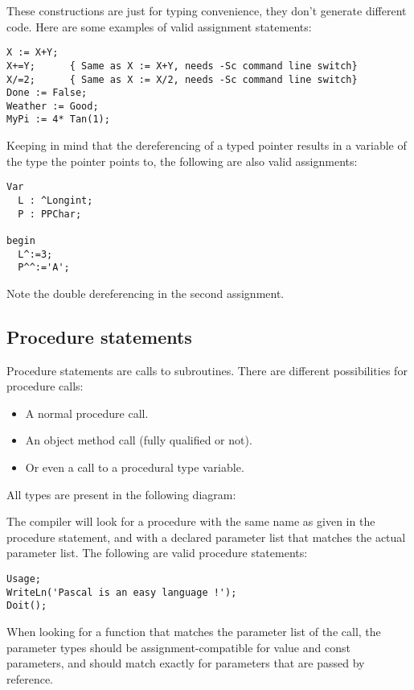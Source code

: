 \begin{remark}
These constructions are just for typing convenience, they
don't generate different code.
Here are some examples of valid assignment statements:
\begin{verbatim}
X := X+Y;
X+=Y;      { Same as X := X+Y, needs -Sc command line switch}
X/=2;      { Same as X := X/2, needs -Sc command line switch}
Done := False;
Weather := Good;
MyPi := 4* Tan(1);
\end{verbatim}
\end{remark}

Keeping in mind that the dereferencing of a typed pointer results
in a variable of the type the pointer points to, the following are
also valid assignments:
\begin{verbatim}
Var
  L : ^Longint;
  P : PPChar;

begin
  L^:=3;
  P^^:='A';
\end{verbatim}
Note the double dereferencing in the second assignment.
\subsection{Procedure statements}
Procedure statements are calls to subroutines. There are
different possibilities for procedure calls:
\begin{itemize}
\item A normal procedure call.
\item An object method call (fully qualified or not).
\item Or even a call to a procedural type variable.
\end{itemize}
All types are present in the following diagram:

The \fpc compiler will look for a procedure with the same name as given in
the procedure statement, and with a declared parameter list that matches the
actual parameter list.
The following are valid procedure statements:
\begin{verbatim}
Usage;
WriteLn('Pascal is an easy language !');
Doit();
\end{verbatim}
\begin{remark}
When looking for a function that matches the parameter list of the call,
the parameter types should be assignment-compatible for value and const
parameters, and should match exactly for parameters that are passed by
reference.
\end{remark}

